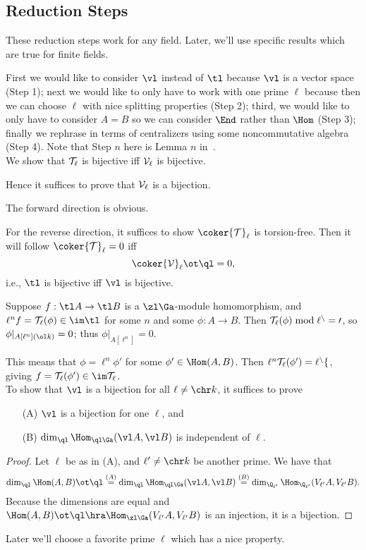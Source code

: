 \subsection{Reduction Steps}
These reduction steps work for any field. Later, we'll use specific results which are true for finite fields.

First we would like to consider $\vl$ instead of $\tl$ because $\vl$ is a vector space (Step 1); next we would like to only have to work with one prime $\ell$ because then we can choose $\ell$ with nice splitting properties (Step 2); third, we would like to only have to consider $A=B$ so we can consider $\End$ rather than $\Hom$ (Step 3); finally we rephrase in terms of centralizers using some noncommutative algebra (Step 4).  Note that Step $n$ here is Lemma $n$ in~\cite[\S1]{Ta66}.\\

 We show that ${\cal T}_{\ell}$ is bijective iff ${\cal V}_{\ell}$ is bijective.

Hence it suffices to prove that ${\cal V}_{\ell}$ is a bijection.

The forward direction is obvious.

For the reverse direction, it suffices to %
show $\coker {\cal T}_{\ell}$ is torsion-free. 
Then it will follow $\coker {\cal T}_{\ell}=0$ iff 
\[\coker {\cal V}_{\ell}\ot \ql=0,\]
i.e., $\cal \tl$ is bijective iff $\cal \vl$ is bijective.

Suppose $f:\tl A\to \tl B$ is a $\zl\Ga$-module homomorphism, and  $\ell^nf={\cal T}_{\ell}(\phi)\in \im\cal \tl$ for some $n$ and some $\phi:A\to B$. Then $\cal T_{\ell}(\phi)\bmod \ell^n=0$, so $\phi|_{A[\ell^n](\ol k)}=0$; %
thus $\phi|_{A[\ell^n]}=0$.


This means that $\phi=\ell^n\phi'$ for some $\phi'\in \Hom(A,B)$. Then $\ell^n\cal T_{\ell}(\phi')=\ell^nf$, giving $f=\cal T_{\ell}(\phi')\in \im \cal T_{\ell}$. \\

 To show that $\cal \vl$ is a bijection for all $\ell\ne \chr k$, it suffices to prove
\begin{enumerate}
\item[(A)] $\cal \vl$ is a bijection for one $\ell$, and
\item[(B)] $\dim_{\ql} \Hom_{\ql\Ga} (\vl A,\vl B)$ is independent of $\ell$.
\end{enumerate}
\begin{proof}
Let $\ell$ be as in (A), and $\ell'\ne \chr k$ be another prime. We have that 
\[
\dim_{\ql}\Hom(A,B)\ot \ql \stackrel{(A)}=\dim_{\ql}\Hom_{\ql\Ga} (\vl A,\vl B)
\stackrel{(B)}=\dim_{\Q_{\ell'}}\Hom_{\Q_{\ell'}}(V_{\ell'}A,V_{\ell'}B).
\]
Because the dimensions are equal and $\Hom(A,B)\ot \ql\hra \Hom_{\zl \Ga}(V_{\ell'}A,V_{\ell'}B)$ is an injection, it is a bijection.
\end{proof}
Later we'll choose a favorite prime $\ell$ which has a nice property.\\


